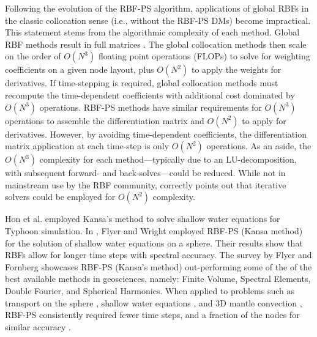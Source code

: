 \documentclass[11pt]{report}
\begin{document}
{Following the evolution of the RBF-PS algorithm, applications of global RBFs in the classic collocation sense (i.e., without the RBF-PS DMs) become impractical. This statement stems from the algorithmic complexity of each method. 
Global RBF methods result in full matrices \cite{Fasshauer2007}. The global collocation methods then scale on the order of $O(N^3)$ floating point operations (FLOPs) to solve for weighting coefficients on a given node layout, plus $O(N^2)$ to apply the weights for derivatives. If time-stepping is required, global collocation methods must recompute the time-dependent coefficients with additional cost dominated by $O(N^3)$ operations. RBF-PS methods have similar requirements for $O(N^3)$ operations to assemble the differentiation matrix and $O(N^2)$ to apply for derivatives. However, by avoiding time-dependent coefficients, the differentiation matrix application at each time-step is only $O(N^2)$ operations. As an aside, the $O(N^3)$ complexity for each method---typically due to an LU-decomposition, with subsequent forward- and back-solves---could be reduced. While not in mainstream use by the RBF community, \cite{Morse2005} correctly points out that iterative solvers could be employed for $O(N^2)$ complexity. 

Hon et al. \cite{Hon1999} employed Kansa's method to solve shallow water equations for Typhoon simulation.
In \cite{FlyerWright09}, Flyer and Wright employed RBF-PS (Kansa method) for the solution of shallow water equations on a sphere. Their 
results show that RBFs allow for longer time steps with spectral accuracy. The survey \cite{FlyerFornberg11} by Flyer and Fornberg showcases RBF-PS (Kansa's method) out-performing some of the of the best available methods in geosciences, namely: Finite Volume, Spectral Elements, Double Fourier, and Spherical Harmonics. When applied to problems such as transport on the sphere \cite{FlyerWright07}, shallow water equations \cite{FlyerWright09}, and 3D mantle convection \cite{WrightFlyerYuen10}, RBF-PS consistently required fewer time steps, and a fraction of the nodes for similar accuracy \cite{FlyerFornberg11}. 






}
\end{document}
